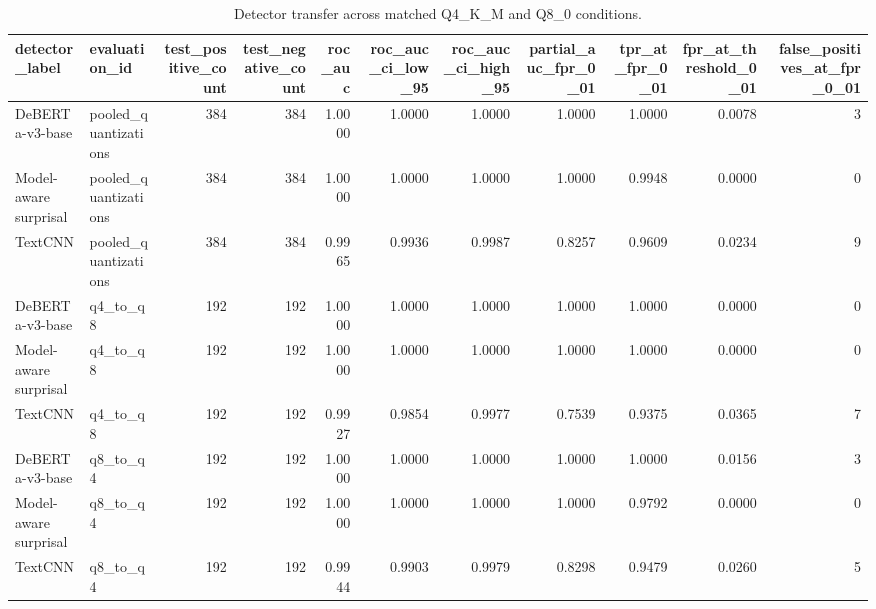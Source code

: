 \begin{table}
\caption{Detector transfer across matched Q4_K_M and Q8_0 conditions.}
\label{tab:matched-quantization-detectors}
\begin{tabular}{llrrrrrrrrr}
\toprule
detector\_label & evaluation\_id & test\_positive\_count & test\_negative\_count & roc\_auc & roc\_auc\_ci\_low\_95 & roc\_auc\_ci\_high\_95 & partial\_auc\_fpr\_0\_01 & tpr\_at\_fpr\_0\_01 & fpr\_at\_threshold\_0\_01 & false\_positives\_at\_fpr\_0\_01 \\
\midrule
DeBERTa-v3-base & pooled\_quantizations & 384 & 384 & 1.0000 & 1.0000 & 1.0000 & 1.0000 & 1.0000 & 0.0078 & 3 \\
Model-aware surprisal & pooled\_quantizations & 384 & 384 & 1.0000 & 1.0000 & 1.0000 & 1.0000 & 0.9948 & 0.0000 & 0 \\
TextCNN & pooled\_quantizations & 384 & 384 & 0.9965 & 0.9936 & 0.9987 & 0.8257 & 0.9609 & 0.0234 & 9 \\
DeBERTa-v3-base & q4\_to\_q8 & 192 & 192 & 1.0000 & 1.0000 & 1.0000 & 1.0000 & 1.0000 & 0.0000 & 0 \\
Model-aware surprisal & q4\_to\_q8 & 192 & 192 & 1.0000 & 1.0000 & 1.0000 & 1.0000 & 1.0000 & 0.0000 & 0 \\
TextCNN & q4\_to\_q8 & 192 & 192 & 0.9927 & 0.9854 & 0.9977 & 0.7539 & 0.9375 & 0.0365 & 7 \\
DeBERTa-v3-base & q8\_to\_q4 & 192 & 192 & 1.0000 & 1.0000 & 1.0000 & 1.0000 & 1.0000 & 0.0156 & 3 \\
Model-aware surprisal & q8\_to\_q4 & 192 & 192 & 1.0000 & 1.0000 & 1.0000 & 1.0000 & 0.9792 & 0.0000 & 0 \\
TextCNN & q8\_to\_q4 & 192 & 192 & 0.9944 & 0.9903 & 0.9979 & 0.8298 & 0.9479 & 0.0260 & 5 \\
\bottomrule
\end{tabular}
\end{table}

